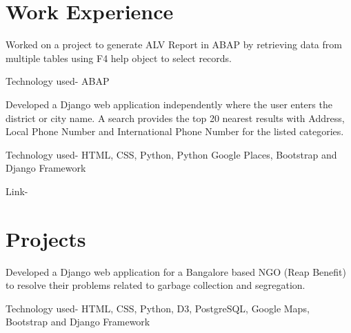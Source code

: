\documentclass[]{resume-openfont}
\begin{document}
\begin{minipage}[t]{0.66\textwidth} 


\section{Work Experience}

Worked on a project to generate ALV Report in ABAP by retrieving data from multiple tables using F4 help object to select records.
\vspace{\topsep} %
\begin{tightemize}
\item Technology used- ABAP
\end{tightemize}
\sectionsep

Developed a Django web application independently where the user enters the district or city name. A search provides the top 20 nearest results with Address, Local Phone Number and International Phone Number for the listed categories. 
\begin{tightemize}
\item Technology used- HTML, CSS, Python, Python Google Places, Bootstrap and Django Framework
\item Link- \href{https://find-my-perfect-place.herokuapp.com/}{}
\end{tightemize}

\sectionsep


\section{Projects}

\sectionsep

Developed a Django web application for a Bangalore based NGO (Reap Benefit) to resolve their problems related to garbage collection and segregation. \\
\begin{tightemize}
\item Technology used- HTML, CSS, Python, D3, PostgreSQL, Google Maps, Bootstrap and Django Framework
\end{tightemize}
\sectionsep


\end{minipage}
\end{document}
